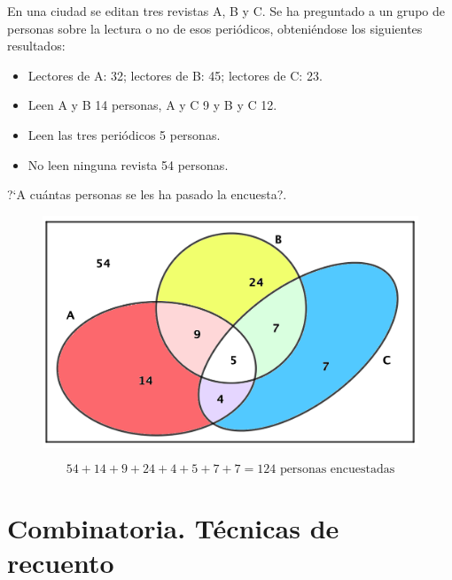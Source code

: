 \begin{ejemplo}
\begin{ejre}
En una ciudad se editan tres revistas A, B y C. Se ha preguntado a un grupo de personas sobre la lectura o no de esos periódicos, obteniéndose los siguientes resultados:
\begin{itemize}
	\vspace{-2mm} \item Lectores de A: 32; lectores de B: 45; lectores de C: 23.
	\vspace{-2mm} \item Leen A y B 14 personas, A y C 9 y B y C 12.
	\vspace{-2mm} \item Leen las tres periódicos 5 personas.
	\vspace{-2mm} \item No leen ninguna revista 54 personas.	
\end{itemize}
?`A cuántas personas se les ha pasado la encuesta?.
\end{ejre}
\end{ejemplo}
	
	\begin{figure}[H]
	\centering
	\includegraphics[width=.6\textwidth]{imagenes/apendices/app09.png}
	\end{figure}

\vspace{-5mm} $$54+14+9+24+4+5+7+7=124 \text{ personas encuestadas}$$




\chapter{Combinatoria. Técnicas de recuento} 
\label{combinatoria}


\vspace{-10mm}
	


